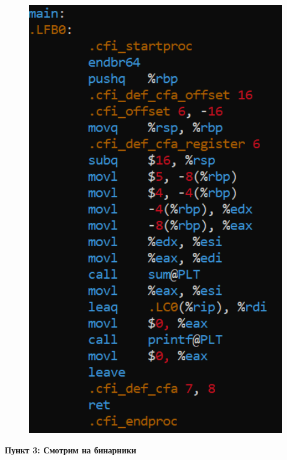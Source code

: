 \documentclass[a4paper,12pt]{article}
\begin{document}
\begin{figure}[H]
{\begin{minipage}[t]{0.4\textwidth}
        \includegraphics[width = 0.996\textwidth]{Листинг с дин библ 64.png}
    \end{minipage}}
\end{figure}

\newpage
\textbf{Пункт 3: Смотрим на бинарники}
\end{document}
